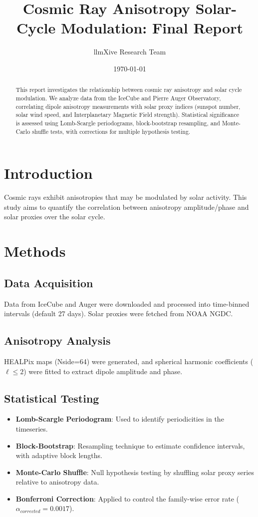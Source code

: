 \documentclass[11pt]{article}
\title{Cosmic Ray Anisotropy Solar-Cycle Modulation: Final Report}
\author{llmXive Research Team}
\date{\today}
\begin{document}
\maketitle

\begin{abstract}
This report investigates the relationship between cosmic ray anisotropy and solar cycle modulation. We analyze data from the IceCube and Pierre Auger Observatory, correlating dipole anisotropy measurements with solar proxy indices (sunspot number, solar wind speed, and Interplanetary Magnetic Field strength). Statistical significance is assessed using Lomb-Scargle periodograms, block-bootstrap resampling, and Monte-Carlo shuffle tests, with corrections for multiple hypothesis testing.
\end{abstract}

\section{Introduction}
Cosmic rays exhibit anisotropies that may be modulated by solar activity. This study aims to quantify the correlation between anisotropy amplitude/phase and solar proxies over the solar cycle.

\section{Methods}
\subsection{Data Acquisition}
Data from IceCube and Auger were downloaded and processed into time-binned intervals (default 27 days). Solar proxies were fetched from NOAA NGDC.

\subsection{Anisotropy Analysis}
HEALPix maps (Nside=64) were generated, and spherical harmonic coefficients ($\ell \le 2$) were fitted to extract dipole amplitude and phase.

\subsection{Statistical Testing}
\begin{itemize}
 \item \textbf{Lomb-Scargle Periodogram}: Used to identify periodicities in the timeseries.
 \item \textbf{Block-Bootstrap}: Resampling technique to estimate confidence intervals, with adaptive block lengths.
 \item \textbf{Monte-Carlo Shuffle}: Null hypothesis testing by shuffling solar proxy series relative to anisotropy data.
 \item \textbf{Bonferroni Correction}: Applied to control the family-wise error rate ($\alpha_{corrected} = 0.0017$).
\end{itemize}
\end{document}
